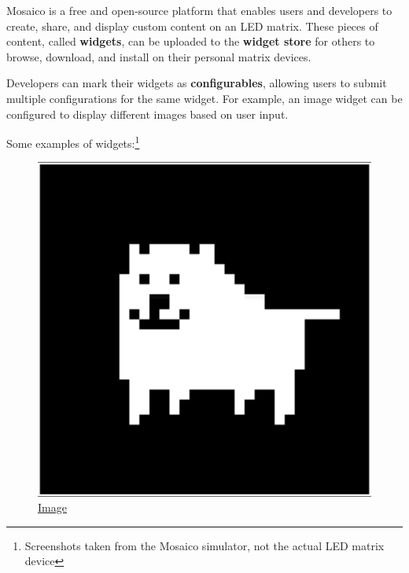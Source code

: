 Mosaico is a free and open-source platform that enables users and developers to create, share, and display custom content on an LED matrix. These pieces of content, called \textbf{widgets}, can be uploaded to the \textbf{widget store} for others to browse, download, and install on their personal matrix devices.

Developers can mark their widgets as \textbf{configurables}, allowing users to submit multiple configurations for the same widget. For example, an image widget can be configured to display different images based on user input.

Some examples of widgets:\footnote{Screenshots taken from the Mosaico simulator, not the actual LED matrix device}

\begin{figure}[h]
    \centering
    \begin{minipage}[b]{0.24\textwidth}
        \centering
        \includegraphics[width=\textwidth]{tesi/img/stylized_widgets/image.png}
        \caption*{\href{https://github.com/mosaico-widgets/image-widget}{Image} }
    \end{minipage}
    \begin{minipage}[b]{0.24\textwidth}
        \centering

\end{minipage}
\end{figure}
